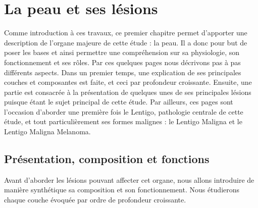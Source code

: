 \renewcommand{\thechapter}{\arabic{chapter}}
\setcounter{chapter}{0}

\chapter{La peau et ses lésions}
\label{chap:chapter_1}
\chapterintro
Comme introduction à ces travaux, ce premier chapitre permet d'apporter une description de l'organe majeure de cette étude : la peau. Il a donc pour but de poser les bases et ainsi permettre une compréhension sur sa physiologie, son fonctionnement et ses rôles. Par ces quelques pages nous décrivons pas à pas différents aspects. Dans un premier temps, une explication de ses principales couches et composantes est faite, et ceci par profondeur croissante. Ensuite, une partie est consacrée à la présentation de quelques unes de ses principales lésions puisque étant le sujet principal de cette étude. Par ailleurs, ces pages sont l'occasion d'aborder une première fois le Lentigo, pathologie centrale de cette étude, et tout particulièrement ses formes malignes : le Lentigo Maligna et le Lentigo Maligna Melanoma.\par
\newpage

\section{Présentation, composition et fonctions}
Avant d’aborder les lésions pouvant affecter cet organe, nous allons introduire de manière synthétique sa composition et son fonctionnement. Nous étudierons chaque couche évoquée par ordre de profondeur croissante.\par

